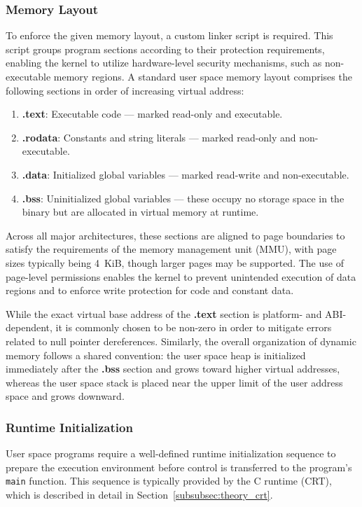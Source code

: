 \documentclass[a4paper,10pt,twoside]{report}
\theoremstyle{definition}
\begin{document}
\subsubsection{Memory Layout}

To enforce the given memory layout, a custom linker script is required. This script groups program sections according to their protection requirements, enabling the kernel to utilize hardware-level security mechanisms, such as non-executable memory regions. A standard user space memory layout comprises the following sections in order of increasing virtual address:
\begin{enumerate}
\item \textbf{.text}: Executable code --- marked read-only and executable.
\item \textbf{.rodata}: Constants and string literals --- marked read-only and non-executable.
\item \textbf{.data}: Initialized global variables --- marked read-write and non-executable.
\item \textbf{.bss}: Uninitialized global variables --- these occupy no storage space in the binary but are allocated in virtual memory at runtime.
\end{enumerate}

Across all major architectures, these sections are aligned to page boundaries to satisfy the requirements of the memory management unit (MMU), with page sizes typically being 4~KiB, though larger pages may be supported. The use of page-level permissions enables the kernel to prevent unintended execution of data regions and to enforce write protection for code and constant data.

While the exact virtual base address of the \textbf{.text} section is platform- and ABI-dependent, it is commonly chosen to be non-zero in order to mitigate errors related to null pointer dereferences. Similarly, the overall organization of dynamic memory follows a shared convention: the user space heap is initialized immediately after the \textbf{.bss} section and grows toward higher virtual addresses, whereas the user space stack is placed near the upper limit of the user address space and grows downward.

\subsubsection{Runtime Initialization}

User space programs require a well-defined runtime initialization sequence to prepare the execution environment before control is transferred to the program's \texttt{main} function. This sequence is typically provided by the C runtime (CRT), which is described in detail in Section~\ref{subsubsec:theory_crt}.
\end{document}
